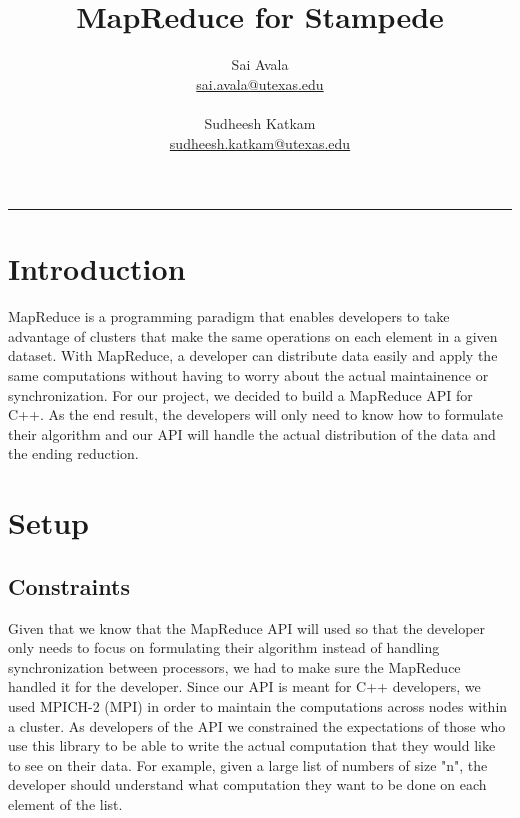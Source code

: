 \documentclass[11pt]{article}
\title{MapReduce for Stampede}
\author{
  Sai Avala\\ 
  \href{mailto:sai.avala@utexas.edu}
          {sai.avala@utexas.edu}  \\ \\
  Sudheesh Katkam \\
  \href{mailto:sudheesh.katkam@utexas.edu}
          {sudheesh.katkam@utexas.edu}  }
\begin{document}
\maketitle
\newpage
\rule{6.0in}{.001in}
\tableofcontents
\newpage

\section{Introduction}
MapReduce is a programming paradigm that enables developers to take advantage of clusters that make the same operations on each element in a given dataset. With MapReduce, a developer can distribute data easily and apply the same computations without having to worry about the actual maintainence or synchronization. For our project, we decided to build a MapReduce API for C++. As the end result, the developers will only need to know how to formulate their algorithm and our API will handle the actual distribution of the data and the ending reduction.


\section{Setup}
\subsection{Constraints}
Given that we know that the MapReduce API will used so that the developer only needs to focus on formulating their algorithm instead of handling synchronization between processors, we had to make sure the MapReduce handled it for the developer. Since our API is meant for C++ developers, we used MPICH-2 (MPI) in order to maintain the computations across nodes within a cluster. As developers of the API we constrained the expectations of those who use this library to be able to write the actual computation that they would like to see on their data. For example, given a large list of numbers of size "n", the developer should understand what computation they want to be done on each element of the list. 
\end{document}
